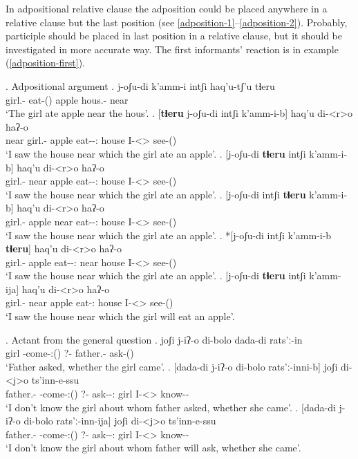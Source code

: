In adpositional relative clause the adposition could be placed anywhere in a relative clause but the last position (see \ref{adposition-1}--\ref{adposition-2}). Probably, participle should be placed in last position in a relative clause, but it should be investigated in more accurate way. The first informants' reaction is in example (\ref{adposition-first}).

\ex. Adpositional argument
	\ag. j-oʃu-di k'amm-i intʃi haq'u-tʃ'u tɬeru\\
			{girl.\Obl-\Erg} {eat-\Pst(\Aor)} apple {hous.\Obl-\Ads} near\\
			\glt `The girl ate apple near the hous'.
	\bg. 	[\textbf{tɬeru} j-oʃu-di  intʃi k'amm-i-b] haq'u di-<r>o haʔ-o\\
			near {girl.\Obl-\Erg} apple {eat-\Pst-\Ptcp:\Pst} house  {I-<\Nans>\Aff} {see-\Pst(\Aor)} \label{adposition-1}\\
			\glt `I saw the house near which the girl ate an apple'.
	\bg. 	[j-oʃu-di \textbf{tɬeru} intʃi k'amm-i-b] haq'u di-<r>o haʔ-o\\
			{girl.\Obl-\Erg} near apple {eat-\Pst-\Ptcp:\Pst} house  {I-<\Nans>\Aff} {see-\Pst(\Aor)} \label{adposition-first}\\
			\glt `I saw the house near which the girl ate an apple'.
	\bg. 	[j-oʃu-di intʃi \textbf{tɬeru} k'amm-i-b] haq'u di-<r>o haʔ-o\\
			{girl.\Obl-\Erg} apple near  {eat-\Pst-\Ptcp:\Pst} house  {I-<\Nans>\Aff} {see-\Pst(\Aor)} \\
			\glt `I saw the house near which the girl ate an apple'.
	\bg. 	*[j-oʃu-di intʃi k'amm-i-b \textbf{tɬeru}] haq'u di-<r>o haʔ-o\\
			{girl.\Obl-\Erg} apple {eat-\Pst-\Ptcp:\Pst} near house  {I-<\Nans>\Aff} {see-\Pst(\Aor)} \\
			\glt `I saw the house near which the girl ate an apple'. \label{adposition-2}
	\bg. 	[j-oʃu-di \textbf{tɬeru} intʃi k'amm-ija] haq'u di-<r>o haʔ-o\\
			{girl.\Obl-\Erg} near apple {eat-\Ptcp:\Pres} house  {I-<\Nans>\Aff} {see-\Pst(\Aor)} \\
			\glt `I saw the house near which the girl will eat an apple'.

\ex. Actant from the general question
	\ag. joʃi j-iʔ-o di-bolo dada-di rats'ː-in\\
			{girl} {\F-come-\Pst:(\Aor)} {?-\Indef} {father.\Obl-\Erg} {ask-\Pst(\Aor)}\\
			\glt `Father asked, whether the girl came'.
	\bg. [dada-di  j-iʔ-o di-bolo rats'ː-inni-b] joʃi di-<j>o ts'inn-e-ssu\\
			{father.\Obl-\Erg} {\F-come-\Pst:(\Aor)} {?-\Indef} {ask-\Pst-\Ptcp:\Pst} {girl}  {I-<\F>\Aff} {know-\Hab-\Neg}\\
			\glt `I don't know the girl about whom father asked, whether she came'.
	\bg. [dada-di  j-iʔ-o di-bolo rats'ː-inn-ija] joʃi di-<j>o ts'inn-e-ssu\\
			{father.\Obl-\Erg} {\F-come-\Pst:(\Aor)} {?-\Indef} {ask-\Npst-\Ptcp:\Pres} {girl}  {I-<\F>\Aff} {know-\Hab-\Neg}\\
			\glt `I don't know the girl about whom father will ask, whether she came'.

